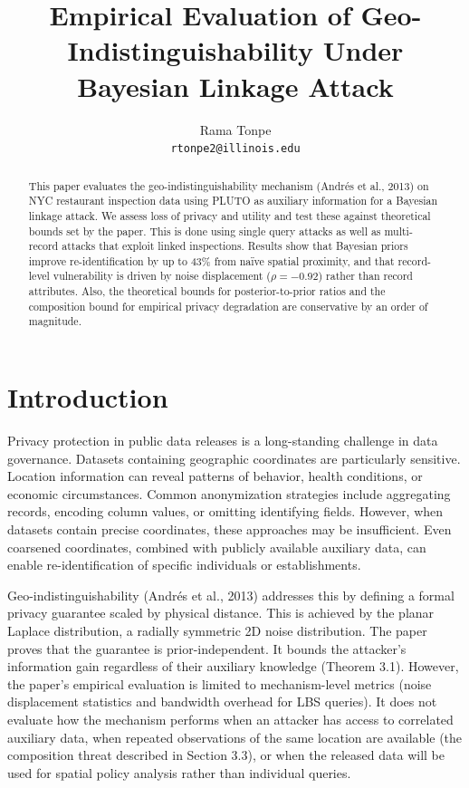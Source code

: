 \documentclass[11pt]{article}
\title{Empirical Evaluation of Geo-Indistinguishability Under Bayesian Linkage Attack}
\author{Rama Tonpe \\ \texttt{rtonpe2@illinois.edu}}
\date{}
\begin{document}
\maketitle

\begin{abstract}
This paper evaluates the geo-indistinguishability mechanism (Andr\'es et al., 2013) on NYC restaurant inspection data using PLUTO as auxiliary information for a Bayesian linkage attack. We assess loss of privacy and utility and test these against theoretical bounds set by the paper. This is done using single query attacks as well as multi-record attacks that exploit linked inspections. Results show that Bayesian priors improve re-identification by up to 43\% from na\"ive spatial proximity, and that record-level vulnerability is driven by noise displacement ($\rho = -0.92$) rather than record attributes. Also, the theoretical bounds for posterior-to-prior ratios and the composition bound for empirical privacy degradation are conservative by an order of magnitude.
\end{abstract}

\section{Introduction}

Privacy protection in public data releases is a long-standing challenge in data governance. Datasets containing geographic coordinates are particularly sensitive. Location information can reveal patterns of behavior, health conditions, or economic circumstances. Common anonymization strategies include aggregating records, encoding column values, or omitting identifying fields. However, when datasets contain precise coordinates, these approaches may be insufficient. Even coarsened coordinates, combined with publicly available auxiliary data, can enable re-identification of specific individuals or establishments.

Geo-indistinguishability (Andr\'es et al., 2013) addresses this by defining a formal privacy guarantee scaled by physical distance. This is achieved by the planar Laplace distribution, a radially symmetric 2D noise distribution. The paper proves that the guarantee is prior-independent. It bounds the attacker's information gain regardless of their auxiliary knowledge (Theorem 3.1). However, the paper's empirical evaluation is limited to mechanism-level metrics (noise displacement statistics and bandwidth overhead for LBS queries). It does not evaluate how the mechanism performs when an attacker has access to correlated auxiliary data, when repeated observations of the same location are available (the composition threat described in Section 3.3), or when the released data will be used for spatial policy analysis rather than individual queries.
\end{document}
